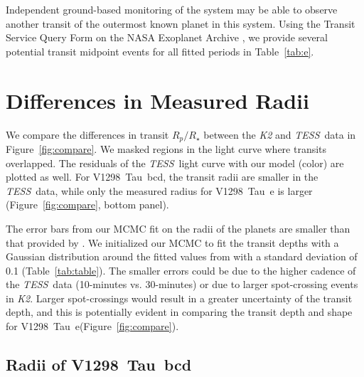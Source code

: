 \documentclass[linenumbers,twocolumn]{aastex631}
\newcommand{\tess}{\textit{TESS}}
\newcommand{\planete}{V1298~Tau~e\xspace}
\newcommand{\planetknown}{V1298~Tau~bcd\xspace}
\begin{document}
Independent ground-based monitoring of the system may be able to observe another transit of the outermost known planet in this system. Using the Transit Service Query Form on the NASA Exoplanet Archive \citep{Akeson2013}, we provide several potential transit midpoint events for all fitted periods in Table~\ref{tab:e}.

\section{Differences in Measured Radii} \label{sec:radii}

We compare the differences in transit $R_p/R_\star$ between the \textit{K2} and \tess\ data in Figure~\ref{fig:compare}. We masked regions in the light curve where transits overlapped. The residuals of the \tess\ light curve with our model (color) are plotted as well. For \planetknown, the transit radii are smaller in the \tess\ data, while only the measured radius for \planete is larger (Figure~\ref{fig:compare}, bottom panel).

The error bars from our MCMC fit on the radii of the planets are smaller than that provided by \cite{David2019b}. We initialized our MCMC to fit the transit depths with a Gaussian distribution around the fitted values from \cite{David2019b} with a standard deviation of 0.1 (Table~\ref{tab:table}). The smaller errors could be due to the higher cadence of the \tess\ data (10-minutes vs. 30-minutes) or due to larger spot-crossing events in \textit{K2}. Larger spot-crossings would result in a greater uncertainty of the transit depth, and this is potentially evident in comparing the transit depth and shape for \planete (Figure~\ref{fig:compare}).


\subsection{Radii of \planetknown}
\end{document}
